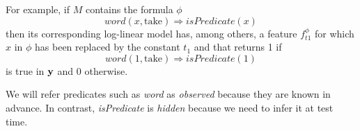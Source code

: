 For example, if $M$ contains the formula $\phi$ \[
word\left(x,\text{take}\right)\Rightarrow isPredicate\left(x\right)\]
then its corresponding log-linear model has, among others, a feature 
$f_{t1}^{\phi}$ for which $x$ in $\phi$ has been replaced by the constant $t_1$ and that returns 1 if \[
word\left(1,\text{take}\right)\Rightarrow isPredicate\left(1\right)\]
is true in $\mathbf{y}$ and 0 otherwise.

We will refer predicates such as \emph{word} as \emph{observed} because they are known in advance. In contrast, \emph{isPredicate} is \emph{hidden} because we need to infer it at test time.


